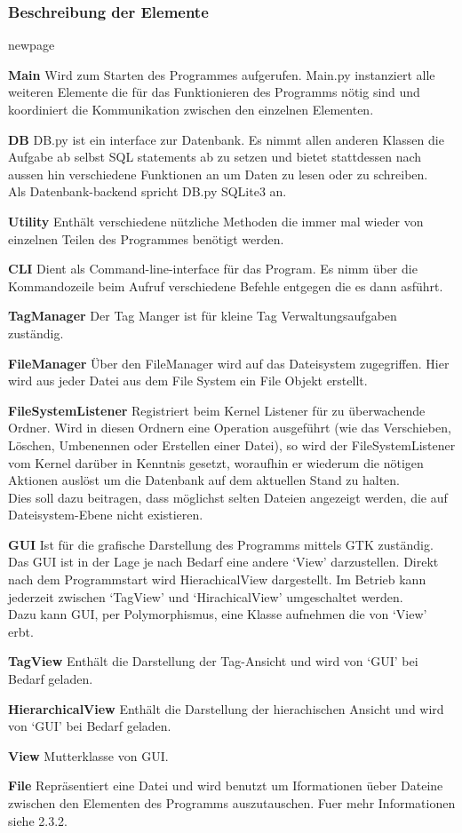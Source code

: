 \documentclass[10pt,paper=a4,final]{scrartcl}
\begin{document}
\subsubsection{Beschreibung der Elemente}
newpage
\begin{description}
  \item{\bf Main} Wird zum Starten des Programmes aufgerufen. Main.py instanziert alle weiteren Elemente die f\"ur das Funktionieren des Programms n\"otig sind und koordiniert die Kommunikation zwischen den einzelnen Elementen.
  \item{\bf DB} DB.py ist ein interface zur Datenbank. Es nimmt allen anderen Klassen die Aufgabe ab selbst SQL statements ab zu setzen und bietet stattdessen nach aussen hin verschiedene Funktionen an um Daten zu lesen oder zu schreiben.\\ Als Datenbank-backend spricht DB.py SQLite3 an.
  \item{\bf Utility} Enth\"alt verschiedene n\"utzliche Methoden die immer mal wieder von einzelnen Teilen des Programmes ben\"otigt werden.
  \item{\bf CLI} Dient als Command-line-interface f\"ur das Program. Es nimm \"uber die Kommandozeile beim Aufruf verschiedene Befehle entgegen die es dann asf\"uhrt.
  \item{\bf TagManager} Der Tag Manger ist für kleine Tag Verwaltungsaufgaben zuständig.
  \item{\bf FileManager} Über den FileManager wird auf das Dateisystem zugegriffen. Hier wird aus jeder Datei aus dem File System ein File Objekt erstellt.
  \item{\bf FileSystemListener} Registriert beim Kernel Listener f\"ur zu \"uberwachende Ordner. Wird in diesen Ordnern eine Operation ausgef\"uhrt (wie das Verschieben, L\"oschen, Umbenennen oder Erstellen einer Datei), so wird der FileSystemListener vom Kernel dar\"uber in Kenntnis gesetzt, woraufhin er wiederum die n\"otigen Aktionen ausl\"ost um die Datenbank auf dem aktuellen Stand zu halten.\\
    Dies soll dazu beitragen, dass m\"oglichst selten Dateien angezeigt werden, die auf Dateisystem-Ebene nicht existieren.
  \item{\bf GUI} Ist f\"ur die grafische Darstellung des Programms mittels GTK zust\"andig. Das GUI ist in der Lage je nach Bedarf eine andere ‘View’ darzustellen. Direkt nach dem Programmstart wird HierachicalView dargestellt. Im Betrieb kann jederzeit zwischen ‘TagView’ und ‘HirachicalView’ umgeschaltet werden.\\
    Dazu kann GUI, per Polymorphismus, eine Klasse aufnehmen die von ‘View’ erbt.
  \item{\bf TagView} Enth\"alt die Darstellung der Tag-Ansicht und wird von ‘GUI’ bei Bedarf geladen.
  \item{\bf HierarchicalView} Enth\"alt die Darstellung der hierachischen Ansicht und wird von ‘GUI’ bei Bedarf geladen.
  \item{\bf View} Mutterklasse von GUI.
  \item{\bf File} Repr\"asentiert eine Datei und wird benutzt um Iformationen \"ueber Dateine zwischen den Elementen des Programms auszutauschen. Fuer mehr Informationen siehe 2.3.2.
\end{description}
\end{document}
